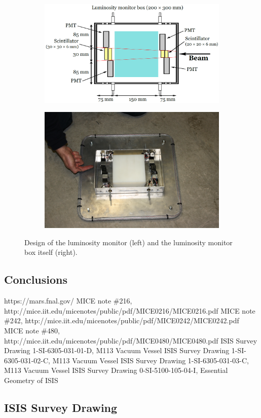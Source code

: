 \documentclass[a4paper,11pt]{article}
\begin{document}
\begin{figure}
  \begin{center}
  \begin{subfigure}
  \centering
    \includegraphics[width=0.59\columnwidth]{./figures/LM2.png}
  \end{subfigure}
  \begin{subfigure}
  \centering
    \includegraphics[width=0.39\columnwidth]{./figures/LM3.jpg}
  \end{subfigure}
  \caption{Design of the luminosity monitor (left) and the luminosity monitor box itself (right).}
  \label{fig:LM3}
  \end{center}
\end{figure}

\section{Conclusions}

\begin{thebibliography}{9}
 https://mars.fnal.gov/
 MICE note \#216, http://mice.iit.edu/micenotes/public/pdf/MICE0216/MICE0216.pdf
 MICE note \#242, http://mice.iit.edu/micenotes/public/pdf/MICE0242/MICE0242.pdf
 MICE note \#480, http://mice.iit.edu/micenotes/public/pdf/MICE0480/MICE0480.pdf
 ISIS Survey Drawing 1-SI-6305-031-01-D, M113 Vacuum Vessel
 ISIS Survey Drawing 1-SI-6305-031-02-C, M113 Vacuum Vessel
 ISIS Survey Drawing 1-SI-6305-031-03-C, M113 Vacuum Vessel
 ISIS Survey Drawing 0-SI-5100-105-04-I, Essential Geometry of ISIS

\end{thebibliography}

\begin{appendices}
\chapter{ISIS Survey Drawing}






\end{appendices}
\end{document}

